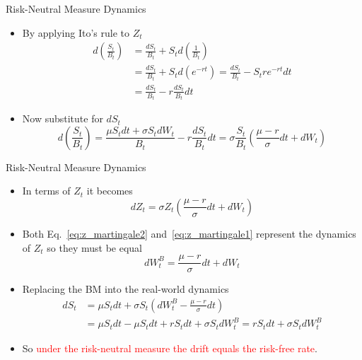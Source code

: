 \documentclass{beamer}
\begin{document}
\begin{frame}{Risk-Neutral Measure Dynamics}
\begin{itemize}
	\item By applying Ito's rule to $Z_t$
	\begin{equation*}
		\begin{aligned}
		d\left(\frac{S_t}{B_t}\right) &= \frac{dS_t}{B_t} + S_t d\left(\frac{1}{B_t}\right) \\ 
		&=\frac{dS_t}{B_t} + S_t d\left(e^{-rt}\right) = \frac{dS_t}{B_t} - S_t re^{-rt}dt \\
		&= \frac{dS_t}{B_t} - r\frac{dS_t}{B_t}dt 
		\end{aligned}
	\end{equation*}
	\item Now substitute for $dS_t$
	\begin{equation*}
		d\left(\frac{S_t}{B_t}\right)= \frac{ \mu S_t dt + \sigma S_t dW_t}{B_t} - r\frac{dS_t}{B_t}dt = \sigma\frac{S_t}{B_t}\left(\frac{\mu - r}{\sigma}dt + dW_t \right)
	\end{equation*}	
\end{itemize}
\end{frame}

\begin{frame}{Risk-Neutral Measure Dynamics}
	\begin{itemize}
	\item In terms of $Z_t$ it becomes
	\begin{equation}
	dZ_t = \sigma Z_t\left(\frac{\mu - r}{\sigma}dt + dW_t \right)
	\label{eq:z_martingale2}
	\end{equation}
	\item Both Eq.~\ref{eq:z_martingale2} and~\ref{eq:z_martingale1} represent the dynamics of $Z_t$ so they must be equal
	\begin{equation*}
		dW_t^B = \frac{\mu - r}{\sigma}dt + dW_t
	\end{equation*}
	\item Replacing the BM into the real-world dynamics
	\begin{equation*}
		\begin{aligned}
		dS_t &= \mu S_t dt + \sigma S_t \left(dW_t^B - \frac{\mu - r}{\sigma}dt\right) \\
		& = \mu S_t dt - \mu S_t dt + rS_t dt + \sigma S_t dW_t^B  = rS_t dt + \sigma S_t dW_t^B
		\end{aligned}
	\end{equation*}
	\item So \textcolor{red}{under the risk-neutral measure the drift equals the risk-free rate}.
\end{itemize}
\end{frame}
\end{document}
